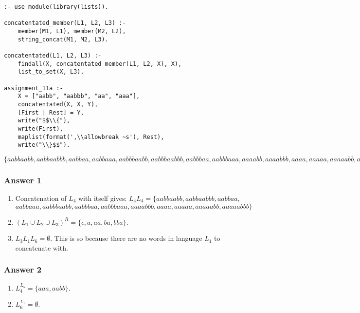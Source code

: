 \documentclass[11pt]{article}
\begin{document}
\lstset{language=prolog,label= ,caption= ,captionpos=b,numbers=none}
\begin{lstlisting}
:- use_module(library(lists)).

concatentated_member(L1, L2, L3) :-
    member(M1, L1), member(M2, L2),
    string_concat(M1, M2, L3).

concatentated(L1, L2, L3) :-
    findall(X, concatentated_member(L1, L2, X), X),
    list_to_set(X, L3).

assignment_11a :-
    X = ["aabb", "aabbb", "aa", "aaa"],
    concatentated(X, X, Y),
    [First | Rest] = Y,
    write("$$\\{"),
    write(First),
    maplist(format(',\\allowbreak ~s'), Rest),
    write("\\}$$").
\end{lstlisting}

\(\{aabbaabb,\allowbreak aabbaabbb,\allowbreak aabbaa,\allowbreak aabbaaa,\allowbreak aabbbaabb,\allowbreak aabbbaabbb,\allowbreak aabbbaa,\allowbreak aabbbaaa,\allowbreak aaaabb,\allowbreak aaaabbb,\allowbreak aaaa,\allowbreak aaaaa,\allowbreak aaaaabb,\allowbreak aaaaabbb,\allowbreak aaaaaa\}\)

\subsubsection{Answer 1}
\label{sec:orgheadline1}
\begin{enumerate}
\item Concatenation of \(L_4\) with itself gives:
\(L_4L_4 = \{aabbaabb, aabbaabbb, aabbaa,\;\) \(aabbaaa, aabbbaabb,
       aabbbaa, aabbbaaa, aaaabbb, aaaa, aaaaa, aaaaabb, aaaaabbb\}\)
\item \((L_1 \cup L_2 \cup L_3)^R = \{\epsilon, a, aa, ba, bba\}\).
\item \(L_3L_1L_6 = \emptyset\).  This is so because there are no words
in language \(L_1\) to concatenate with.
\end{enumerate}

\subsubsection{Answer 2}
\label{sec:orgheadline2}
\begin{enumerate}
\item \(L_4^{L_5} = \{aaa, aabb\}\).
\item \(L_6^{L_1} = \emptyset\).
\end{enumerate}
\end{document}
